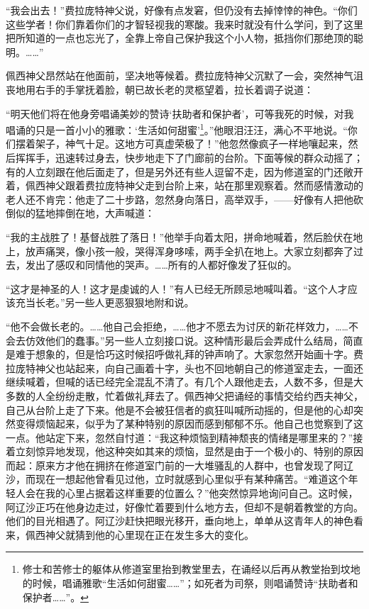 \par “我会出去！”费拉庞特神父说，好像有点发窘，但仍没有去掉悻悻的神色。“你们这些学者！你们靠着你们的才智轻视我的寒酸。我来时就没有什么学问，到了这里把所知道的一点也忘光了，全靠上帝自己保护我这个小人物，抵挡你们那绝顶的聪明。……”
\par 佩西神父昂然站在他面前，坚决地等候着。费拉庞特神父沉默了一会，突然神气沮丧地用右手的手掌抚着脸，朝已故长老的灵柩望着，拉长着调子说道：
\par “明天他们将在他身旁唱诵美妙的赞诗‘扶助者和保护者’，可等我死的时候，对我唱诵的只是一首小小的雅歌：‘生活如何甜蜜’\footnote{修士和苦修士的躯体从修道室里抬到教堂里去，在诵经以后再从教堂抬到坟地的时候，唱诵雅歌“生活如何甜蜜……”；如死者为司祭，则唱诵赞诗“扶助者和保护者……”。}。”他眼泪汪汪，满心不平地说。“你们摆着架子，神气十足。这地方可真虚荣极了！”他忽然像疯子一样地嚷起来，然后挥挥手，迅速转过身去，快步地走下了门廊前的台阶。下面等候的群众动摇了；有的人立刻跟在他后面走了，但是另外还有些人逗留不走，因为修道室的门还敞开着，佩西神父跟着费拉庞特神父走到台阶上来，站在那里观察着。然而感情激动的老人还不肯完：他走了二十步路，忽然身向落日，高举双手，——好像有人把他砍倒似的猛地摔倒在地，大声喊道：
\par “我的主战胜了！基督战胜了落日！”他举手向着太阳，拼命地喊着，然后脸伏在地上，放声痛哭，像小孩一般，哭得浑身哆嗦，两手全扒在地上。大家立刻都奔了过去，发出了感叹和同情他的哭声。……所有的人都好像发了狂似的。
\par “这才是神圣的人！这才是虔诚的人！”有人已经无所顾忌地喊叫着。“这个人才应该充当长老。”另一些人更恶狠狠地附和说。
\par “他不会做长老的。……他自己会拒绝，……他才不愿去为讨厌的新花样效力，……不会去仿效他们的蠢事。”另一些人立刻接口说。这种情形最后会弄成什么结局，简直是难于想象的，但是恰巧这时候招呼做礼拜的钟声响了。大家忽然开始画十字。费拉庞特神父也站起来，向自己画着十字，头也不回地朝自己的修道室走去，一面还继续喊着，但喊的话已经完全混乱不清了。有几个人跟他走去，人数不多，但是大多数的人全纷纷走散，忙着做礼拜去了。佩西神父把诵经的事情交给约西夫神父，自己从台阶上走了下来。他是不会被狂信者的疯狂叫喊所动摇的，但是他的心却突然变得烦恼起来，似乎为了某种特别的原因而感到郁郁不乐。他自己也觉察到了这一点。他站定下来，忽然自忖道：“我这种烦恼到精神颓丧的情绪是哪里来的？”接着立刻惊异地发现，他这种突如其来的烦恼，显然是由于一个极小的、特别的原因而起：原来方才他在拥挤在修道室门前的一大堆骚乱的人群中，也曾发现了阿辽沙，而现在一想起他曾看见过他，立时就感到心里似乎有某种痛苦。“难道这个年轻人会在我的心里占据着这样重要的位置么？”他突然惊异地询问自己。这时候，阿辽沙正巧在他身边走过，好像忙着要到什么地方去，但却不是朝着教堂的方向。他们的目光相遇了。阿辽沙赶快把眼光移开，垂向地上，单单从这青年人的神色看来，佩西神父就猜到他的心里现在正在发生多大的变化。
